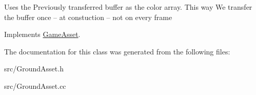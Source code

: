 Uses the Previously transferred buffer as the color array. This way We transfer the buffer once -- at constuction -- not on every frame

Implements \hyperlink{class_game_asset}{Game\+Asset}.



The documentation for this class was generated from the following files\+:\begin{DoxyCompactItemize}
\item 
src/Ground\+Asset.\+h\item 
src/Ground\+Asset.\+cc\end{DoxyCompactItemize}
